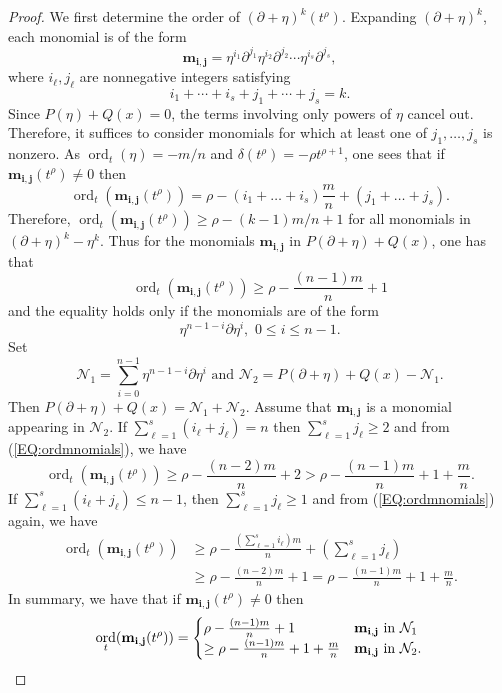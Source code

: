 \documentclass{article}
\DeclareMathOperator{\ord}{ord}
\newcommand{\bfm} { {\mathbf{m}}}
\newcommand{\bfi} { {\mathbf{i}}}
\newcommand{\bfj} { {\mathbf{j}}}
\newcommand{\calN}{{\mathcal{N}}}
\begin{document}
\begin{proof}
We first determine the order of $(\partial+\eta)^k(t^\rho)$. Expanding $(\partial+\eta)^k$, each monomial is of the form
$$
\bfm_{\bfi,\bfj}=\eta^{i_1}\partial^{j_1}\eta^{i_2}\partial^{j_2}\cdots \eta^{i_s}\partial^{j_s},
$$
where $i_\ell,j_\ell$ are nonnegative integers satisfying
$$
i_1+\cdots+i_s+j_1+\cdots+j_s=k.
$$
Since $P(\eta)+Q(x)=0$, the terms involving only powers of $\eta$ cancel out. Therefore, it suffices to consider monomials for which at least one of $j_1,\dots,j_s$ is nonzero.
As $\ord_t(\eta)=-m/n$ and $\delta(t^\rho)=-\rho t^{\rho+1}$, one sees that if 
$\bfm_{\bfi,\bfj}(t^\rho)\neq 0$
 then
\begin{equation}
  \label{EQ:ordmnomials}
  \ord_t (\bfm_{\bfi,\bfj}(t^\rho))=\rho-\left(i_1+\dots+i_s\right)\frac{m}{n}+(j_1+\dots+j_s).
\end{equation}
Therefore, 
$\ord_t(\bfm_{\bfi,\bfj}(t^\rho))\geq \rho-(k-1)m/n+1$
 for all monomials in $(\partial+\eta)^k-\eta^k$. Thus for the monomials $\bfm_{\bfi,\bfj}$ in $P(\partial+\eta)+Q(x)$, one has that 
 $$
     \ord_t(\bfm_{\bfi,\bfj}(t^\rho))\geq \rho-\frac{(n-1)m}{n}+1
 $$
 and the equality holds only if the monomials are of the form 
$$
     \eta^{n-1-i}\partial \eta^{i},\,\,0\leq i \leq n-1.
$$ 
Set 
$$
 \calN_1=\sum_{i=0}^{n-1} \eta^{n-1-i}\partial \eta^{i} \,\,\text{and}\,\, \calN_2=P(\partial+\eta)+Q(x)-\calN_1.
$$
Then $P(\partial+\eta) + Q(x)=\calN_1+\calN_2$. 
Assume that $\bfm_{\bfi,\bfj}$ is a monomial appearing in $\calN_2$.  If $\sum_{\ell=1}^s(i_\ell+j_\ell)=n$ then $\sum_{\ell=1}^s j_\ell\geq 2$ and from (\ref{EQ:ordmnomials}), we have
$$
     \ord_t(\bfm_{\bfi,\bfj}(t^\rho))\geq \rho-\frac{(n-2)m}{n}+2>\rho-\frac{(n-1)m}{n}+1+\frac{m}{n}.
$$
If $\sum_{\ell=1}^s(i_\ell+j_\ell)\leq n-1$, then $\sum_{\ell=1}^s j_\ell\geq 1$ and from (\ref{EQ:ordmnomials}) again, we have
\begin{align*}
  \ord_t(\bfm_{\bfi,\bfj}(t^\rho))&\geq \rho-\frac{(\sum_{\ell=1}^s i_\ell)m}{n}+\left(\sum_{\ell=1}^s j_\ell\right)\\
  &\geq \rho - \frac{(n-2)m}{n}+1 = \rho-\frac{(n-1)m}{n}+1+\frac{m}{n}.
\end{align*}
In summary, we have that if $\bfm_{\bfi,\bfj}(t^\rho)\neq 0$ then
\begin{equation}
\label{EQ:minimalorder}
   \ord_t(\bfm_{\bfi,\bfj}(t^\rho))=\begin{cases} 
  \rho-\frac{(n-1)m}{n}+1 & \text{$\bfm_{\bfi,\bfj}$ in $\calN_1$}\\
   \geq \rho-\frac{(n-1)m}{n}+1+\frac{m}{n} & \text{$\bfm_{\bfi,\bfj}$ in $\calN_2$}.


\end{cases}
\end{equation}
\end{proof}
\end{document}
